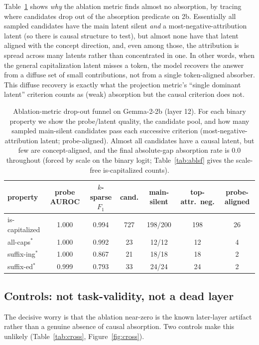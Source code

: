 \documentclass[11pt]{article}
\newcommand{\iscap}{\textsf{is-capitalized}}
\newcommand{\allcaps}{\textsf{all-caps}}
\newcommand{\suffing}{\textsf{suffix-ing}}
\newcommand{\suffed}{\textsf{suffix-ed}}
\theoremstyle{definition}
\begin{document}
Table~\ref{tab:funnel} shows \emph{why} the ablation metric finds almost no absorption, by tracing where candidates drop
out of the absorption predicate on 2b. Essentially all sampled candidates have the main latent silent
\emph{and} a most-negative-attribution latent (so there is causal structure to test), but almost none have
that latent aligned with the concept direction, and, even among those, the attribution is spread across
many latents rather than concentrated in one. In other words, when the general capitalization latent misses
a token, the model recovers the answer from a diffuse set of small contributions, not from a single
token-aligned absorber. This diffuse recovery is exactly what the projection metric's ``single dominant
latent'' criterion counts as (weak) absorption but the causal criterion does not.

\begin{table}[t]
  \centering
  \caption{Ablation-metric drop-out funnel on Gemma-2-2b (layer 12). For each binary property we show the
  probe/latent quality, the candidate pool, and how many sampled main-silent candidates pass each successive
  criterion (most-negative-attribution latent; probe-aligned). Almost all candidates have a causal
  latent, but few are concept-aligned, and the final absolute-gap absorption rate is $0.0$ throughout
  (forced by scale on the binary logit; Table~\ref{tab:ablsf} gives the scale-free \iscap{} counts).}
  \label{tab:funnel}
  \small
  \begin{tabular}{lcccccc}
    \toprule
    property & probe AUROC & $k$-sparse $F_1$ & cand. & main-silent & top-attr.\ neg. & probe-aligned \\
    \midrule
    \iscap{}   & 1.000 & 0.994 & 727 & 198/200 & 198 & 26 \\
    \allcaps{}$^\ast$ & 1.000 & 0.992 & 23  & 12/12   & 12  & 4  \\
    \suffing{}$^\ast$ & 1.000 & 0.867 & 21  & 18/18   & 18  & 2  \\
    \suffed{}$^\ast$  & 0.999 & 0.793 & 33  & 24/24   & 24  & 2  \\
    \bottomrule
  \end{tabular}
\end{table}

\subsection{Controls: not task-validity, not a dead layer}\label{sec:controls}
The decisive worry is that the ablation near-zero is the known later-layer artifact rather than a genuine absence
of causal absorption. Two controls make this unlikely (Table~\ref{tab:cross}, Figure~\ref{fig:cross}).
\end{document}
